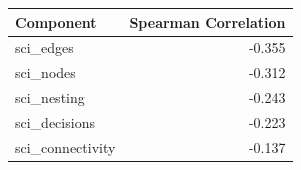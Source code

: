 \begin{tabular}{lr}
\toprule
Component & Spearman Correlation \\
\midrule
sci_edges & -0.355 \\
sci_nodes & -0.312 \\
sci_nesting & -0.243 \\
sci_decisions & -0.223 \\
sci_connectivity & -0.137 \\
\bottomrule
\end{tabular}
